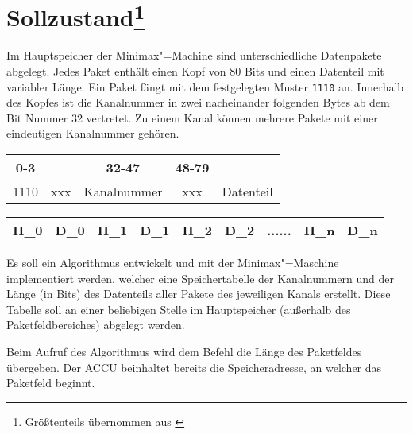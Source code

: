 \chapter[Sollzustand]{Sollzustand\footnote{Größtenteils übernommen aus \cite{aufgabenblatt}}}
\label{chapter:Pflichtenheft-Sollzustand}

Im Hauptspeicher der Minimax"=Machine sind unterschiedliche Datenpakete abgelegt. Jedes Paket enthält einen Kopf von 80 Bits und einen Datenteil mit variabler Länge. Ein Paket fängt mit dem festgelegten Muster \texttt{1110} an. Innerhalb des Kopfes ist die Kanalnummer in zwei nacheinander folgenden Bytes ab dem Bit Nummer 32 vertretet. Zu einem Kanal können mehrere Pakete mit einer eindeutigen Kanalnummer gehören.

\begin{center}
    \begin{tabular}{|c|c|c|c|c|}
        \multicolumn{1}{c}{0-3} & \multicolumn{1}{c}{} & \multicolumn{1}{c}{32-47} & \multicolumn{1}{c}{48-79} & \multicolumn{1}{c}{} \\
        \hline
        1110 & xxx & Kanalnummer & xxx & \hspace{1cm} Datenteil \hspace{1cm} \\
        \hline
    \end{tabular}
\end{center}

\begin{center}
    \begin{tabular}{|c|c|c|c|c|c|c|c|c|}
        \hline
        H_0 & \hspace{.3cm} D_0 \hspace*{.3cm} & H_1 & D_1 & H_2 & \hspace{1cm} D_2 \hspace*{1cm} & ...... & H_n & D_n \\
        \hline
    \end{tabular}
\end{center}

Es soll ein Algorithmus entwickelt und mit der Minimax"=Maschine implementiert werden, welcher eine Speichertabelle der Kanalnummern und der Länge (in Bits) des Datenteils aller Pakete des jeweiligen Kanals erstellt. Diese Tabelle soll an einer beliebigen Stelle im Hauptspeicher (außerhalb des Paketfeldbereiches) abgelegt werden.

Beim Aufruf des Algorithmus wird dem Befehl die Länge des Paketfeldes übergeben. Der ACCU beinhaltet bereits die Speicheradresse, an welcher das Paketfeld beginnt.
